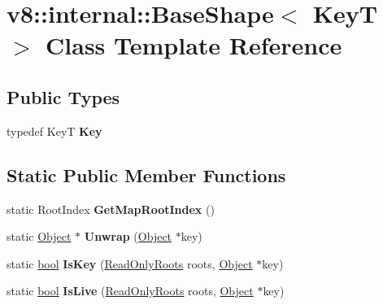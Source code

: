 \hypertarget{classv8_1_1internal_1_1BaseShape}{}\section{v8\+:\+:internal\+:\+:Base\+Shape$<$ KeyT $>$ Class Template Reference}
\label{classv8_1_1internal_1_1BaseShape}
\subsection*{Public Types}
\begin{DoxyCompactItemize}
\item 
\mbox{\label{classv8_1_1internal_1_1BaseShape_aa8c6309683bdbeae8c436fdb542326f0}} 
typedef KeyT {\bfseries Key}
\end{DoxyCompactItemize}
\subsection*{Static Public Member Functions}
\begin{DoxyCompactItemize}
\item 
\mbox{\label{classv8_1_1internal_1_1BaseShape_a0d1036796619455ee246d2d0abaebb89}} 
static Root\+Index {\bfseries Get\+Map\+Root\+Index} ()
\item 
\mbox{\label{classv8_1_1internal_1_1BaseShape_a61538b3d7deb70084e5906fa47ddb922}} 
static \mbox{\hyperlink{classv8_1_1internal_1_1Object}{Object}} $\ast$ {\bfseries Unwrap} (\mbox{\hyperlink{classv8_1_1internal_1_1Object}{Object}} $\ast$key)
\item 
\mbox{\label{classv8_1_1internal_1_1BaseShape_a997629e23cf52839e0be77988945b6b8}} 
static \mbox{\hyperlink{classbool}{bool}} {\bfseries Is\+Key} (\mbox{\hyperlink{classv8_1_1internal_1_1ReadOnlyRoots}{Read\+Only\+Roots}} roots, \mbox{\hyperlink{classv8_1_1internal_1_1Object}{Object}} $\ast$key)
\item 
\mbox{\label{classv8_1_1internal_1_1BaseShape_a2229996aab270aaf02fd0194616b2b91}} 
static \mbox{\hyperlink{classbool}{bool}} {\bfseries Is\+Live} (\mbox{\hyperlink{classv8_1_1internal_1_1ReadOnlyRoots}{Read\+Only\+Roots}} roots, \mbox{\hyperlink{classv8_1_1internal_1_1Object}{Object}} $\ast$key)
\end{DoxyCompactItemize}

